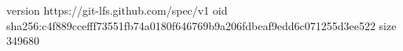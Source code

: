 version https://git-lfs.github.com/spec/v1
oid sha256:c4f889ccefff73551fb74a0180f646769b9a206fdbeaf9edd6c071255d3ee522
size 349680
